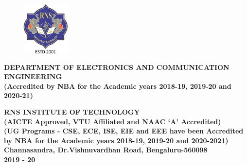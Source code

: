 \begin{titlingpage}
\begin{figure}[h]
	\centering
	\includegraphics[height=2.7cm]{images/rns1.jpg}
\end{figure}

\begin{center}
	\scriptsize\textbf{DEPARTMENT OF ELECTRONICS AND COMMUNICATION ENGINEERING}\\
	\small\textbf{(Accredited by NBA for the Academic years 2018-19, 2019-20 and 2020-21)}	
\end{center}
\begin{center}
	\vspace{0.1cm}
	\large\textbf{RNS INSTITUTE OF TECHNOLOGY}\\
	\small\textbf{(AICTE Approved, VTU Affiliated and NAAC `A' Accredited)\\
		(UG Programs - CSE, ECE, ISE, EIE and EEE have been Accredited by NBA for the Academic years 2018-19, 2019-20 and 2020-2021)\\
		Channasandra, Dr.Vishnuvardhan Road, Bengaluru-560098\\
		2019 - 20}
\end{center}

\end{titlingpage}
